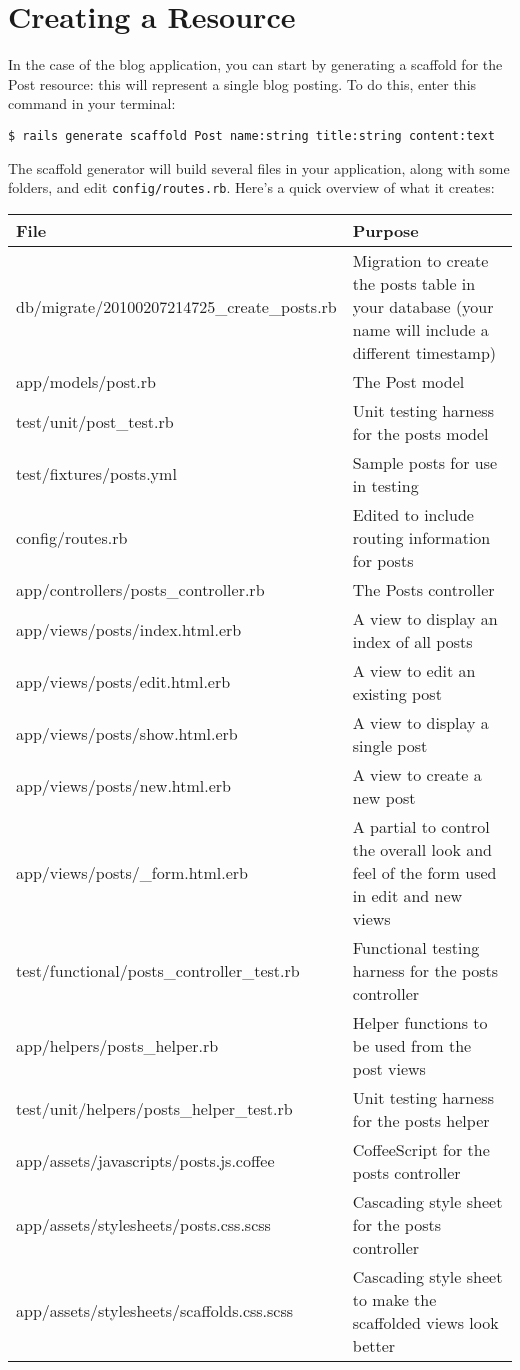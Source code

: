 \documentclass[10pt]{book}
\begin{document}
\section{ Creating a Resource}

In the case of the blog application, you can start by generating a scaffold for the Post resource: this will represent a single blog posting. To do this, enter this command in your terminal:
\begin{verbatim}
$ rails generate scaffold Post name:string title:string content:text
\end{verbatim}

The scaffold generator will build several files in your application, along with some folders, and edit \texttt{config/routes.rb}. Here’s a quick overview of what it creates:

\begin{tabular}{p{}|p{}}
\hline
\textbf{File} & \textbf{Purpose} \\ 
\hline
db/migrate/20100207214725\_create\_posts.rb     & Migration to create the posts table in your database (your name will include a different timestamp) \\ 
app/models/post.rb                            & The Post model \\ 
test/unit/post\_test.rb                        & Unit testing harness for the posts model \\ 
test/fixtures/posts.yml                       & Sample posts for use in testing \\ 
config/routes.rb                              & Edited to include routing information for posts \\ 
app/controllers/posts\_controller.rb           & The Posts controller \\ 
app/views/posts/index.html.erb                & A view to display an index of all posts  \\ 
app/views/posts/edit.html.erb                 & A view to edit an existing post \\ 
app/views/posts/show.html.erb                 & A view to display a single post \\ 
app/views/posts/new.html.erb                  & A view to create a new post \\ 
app/views/posts/\_form.html.erb                & A partial to control the overall look and feel of the form used in edit and new views \\ 
test/functional/posts\_controller\_test.rb      & Functional testing harness for the posts controller \\ 
app/helpers/posts\_helper.rb                   & Helper functions to be used from the post views \\ 
test/unit/helpers/posts\_helper\_test.rb        & Unit testing harness for the posts helper \\ 
app/assets/javascripts/posts.js.coffee        & CoffeeScript for the posts controller \\ 
app/assets/stylesheets/posts.css.scss         & Cascading style sheet for the posts controller \\ 
app/assets/stylesheets/scaffolds.css.scss     & Cascading style sheet to make the scaffolded views look better
\end{tabular}
\end{document}
